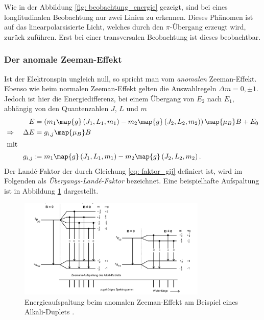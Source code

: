 \FloatBarrier
Wie in der Abbildung \ref{fig: beobachtung_energie} gezeigt, sind bei eines longlitudinalen Beobachtung nur zwei
Linien zu erkennen. Dieses Phänomen ist auf das linearpolarsisierte Licht, welches durch den $\pi$-Übergang erzeugt wird,
zurück zuführen. Erst bei einer transversalen Beobachtung ist dieses beobachtbar.  

\subsubsection{Der anomale Zeeman-Effekt}
Ist der Elektronspin ungleich null, so spricht man vom \emph{anomalen} Zeeman-Effekt.
Ebenso wie beim normalen Zeeman-Effekt gelten die Auswahlregeln $\Delta m=0, \pm 1$.
Jedoch ist hier die Energiedifferenz, bei einem Übergang von $E_2$ nach $E_1$,
abhängig von den Quantenzahlen $J$, $L$ und $m$
\begin{align}
  E&=\left(m_1\map{g}\left(J_1,L_1,m_1\right)-m_2\map{g}\left(J_2,L_2,m_2\right)\right)\map{\mu_B}B+E_0 \notag \\
  \Rightarrow \quad \Delta E&=g_{i,j}\map{\mu_B}B \label{eq:energie_anomale_zemman}\\
\shortintertext{mit}
g_{i,j}:\!\!&=m_1\map{g}\left(J_1,L_1,m_1\right)-m_2\map{g}\left(J_2,L_2,m_2\right)\label{eq: faktor_gij}.
\end{align}
Der Landé-Faktor der durch Gleichung \eqref{eq: faktor_gij} definiert ist, wird im Folgenden als \emph{Übergangs-Landé-Faktor} bezeichnet.
Eine beispielhafte Aufspaltung ist in Abbildung \ref{fig: energie_aufspaltung_annomaler} dargestellt.
\FloatBarrier
\begin{figure}[h]
  \centering
  \includegraphics[width=0.8\textwidth]{pics/energieaufspaltung_annomaler.png}
  \caption{Energieaufspaltung beim anomalen Zeeman-Effekt am Beispiel eines Alkali-Duplets \cite{anleitung27}.}
  \label{fig: energie_aufspaltung_annomaler}
\end{figure}
\FloatBarrier

